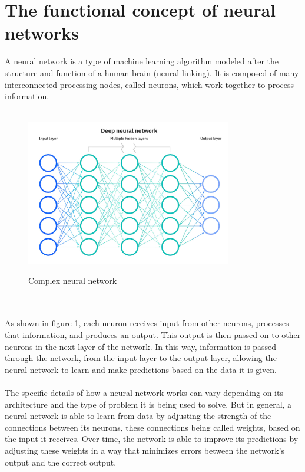 \section{The functional concept of neural networks}
A neural network is a type of machine learning algorithm modeled 
after the structure and function of a human brain (neural linking). 
It is composed of many interconnected processing nodes, called neurons, 
which work together to process information. 
\\
\\
\begin{figure}[htb]
    \centering
    \includegraphics[width=0.8\textwidth]{pics/neuralnetwork.jpg}
    \caption{Complex neural network}
    \label{fig:neuralnetwork}
    \cite{IBM}
\end{figure}
\\
\\
As shown in figure \ref{fig:neuralnetwork}, each neuron receives input from other neurons, processes that information, 
and produces an output. This output is then passed on to other neurons in the next 
layer of the network. In this way, information is passed through the network, from the 
input layer to the output layer, allowing the neural network to learn and make predictions
based on the data it is given. \cite{book1}
\\
\\
The specific details of how a neural network works can vary depending on its architecture
and the type of problem it is being used to solve. But in general, a neural network is able 
to learn from data by adjusting the strength of the connections between its neurons, these 
connections being called weights, based on the input it receives. Over time, the network is 
able to improve its predictions by adjusting these weights in a way that minimizes errors 
between the network's output and the correct output.

